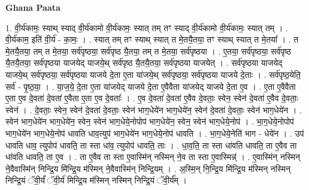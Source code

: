 \documentclass[17pt]{extarticle}
\begin{document}
\textbf{Ghana Paata } \newline

1. वी॒र्य॑कामः॒ स्याथ् स्याद् वी॒र्य॑कामो वी॒र्य॑कामः॒ स्यात् तम् तꣳ स्याद् वी॒र्य॑कामो वी॒र्य॑कामः॒ स्यात् तम् । . वी॒र्य॑काम॒ इति॑ वी॒र्य॑ - का॒मः॒ । . स्यात् तम् तꣳ स्याथ् स्यात् त मे॒तयै॒तया॒ तꣳ स्याथ् स्यात् त मे॒तया᳚ । . त मे॒तयै॒तया॒ तम् त मे॒तया॒ सर्व॑पृष्ठया॒ सर्व॑पृष्ठ यै॒तया॒ तम् त मे॒तया॒ सर्व॑पृष्ठया । . ए॒तया॒ सर्व॑पृष्ठया॒ सर्व॑पृष्ठ यै॒तयै॒तया॒ सर्व॑पृष्ठया याजयेद् याजये॒थ् सर्व॑पृष्ठ यै॒तयै॒तया॒ सर्व॑पृष्ठया याजयेत् । . सर्व॑पृष्ठया याजयेद् याजये॒थ् सर्व॑पृष्ठया॒ सर्व॑पृष्ठया याजये दे॒ता ए॒ता या॑जये॒थ् सर्व॑पृष्ठया॒ सर्व॑पृष्ठया याजये दे॒ताः । . सर्व॑पृष्ठ॒येति॒ सर्व॑ - पृ॒ष्ठ॒या॒ । . या॒ज॒ये॒ दे॒ता ए॒ता या॑जयेद् याजये दे॒ता ए॒वैवैता या॑जयेद् याजये दे॒ता ए॒व । . ए॒ता ए॒वैवैता ए॒ता ए॒व दे॒वता॑ दे॒वता॑ ए॒वैता ए॒ता ए॒व दे॒वताः᳚ । . ए॒व दे॒वता॑ दे॒वता॑ ए॒वैव दे॒वताः॒ स्वेन॒ स्वेन॑ दे॒वता॑ ए॒वैव दे॒वताः॒ स्वेन॑ । . दे॒वताः॒ स्वेन॒ स्वेन॑ दे॒वता॑ दे॒वताः॒ स्वेन॑ भाग॒धेये॑न भाग॒धेये॑न॒ स्वेन॑ दे॒वता॑ दे॒वताः॒ स्वेन॑ भाग॒धेये॑न । . स्वेन॑ भाग॒धेये॑न भाग॒धेये॑न॒ स्वेन॒ स्वेन॑ भाग॒धेये॒नोपोप॑ भाग॒धेये॑न॒ स्वेन॒ स्वेन॑ भाग॒धेये॒नोप॑ । . भा॒ग॒धेये॒नोपोप॑ भाग॒धेये॑न भाग॒धेये॒नोप॑ धावति धाव॒त्युप॑ भाग॒धेये॑न भाग॒धेये॒नोप॑ धावति । . भा॒ग॒धेये॒नेति॑ भाग - धेये॑न । . उप॑ धावति धाव॒ त्युपोप॑ धावति॒ ता स्ता धा॑व॒ त्युपोप॑ धावति॒ ताः । . धा॒व॒ति॒ ता स्ता धा॑वति धावति॒ ता ए॒वैव ता धा॑वति धावति॒ ता ए॒व । . ता ए॒वैव ता स्ता ए॒वास्मि॑न् नस्मिन् ने॒व ता स्ता ए॒वास्मिन्न्॑ । . ए॒वास्मि॑न् नस्मिन् ने॒वैवास्मि॑न् निन्द्रि॒य मि॑न्द्रि॒य म॑स्मिन् ने॒वैवास्मि॑न् निन्द्रि॒यम् । . अ॒स्मि॒न् नि॒न्द्रि॒य मि॑न्द्रि॒य म॑स्मिन् नस्मिन् निन्द्रि॒यं ॅवी॒र्यं॑ ॅवी॒र्य॑ मिन्द्रि॒य म॑स्मिन् नस्मिन् निन्द्रि॒यं ॅवी॒र्य᳚म् । \newline
\end{document}
